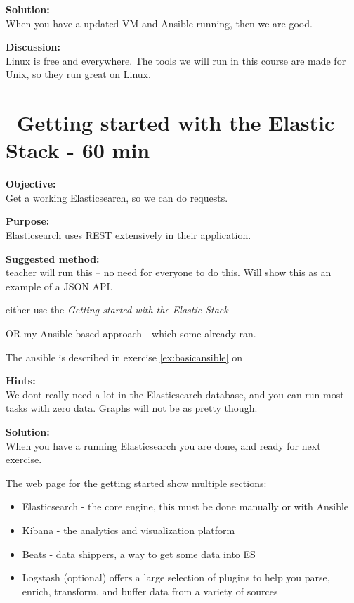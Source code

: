 \documentclass[a4paper,11pt,notitlepage]{report}
\begin{document}
{\bf Solution:}\\
When you have a updated VM and Ansible running, then we are good.

{\bf Discussion:}\\
Linux is free and everywhere. The tools we will run in this course are made for Unix, so they run great on Linux.



\chapter{\faInfoCircle\ Getting started with the Elastic Stack - 60 min}
\label{ex:dateformats}


{\bf Objective:}\\
Get a working Elasticsearch, so we can do requests.

{\bf Purpose:}\\
Elasticsearch uses REST extensively in their application.

{\bf Suggested method:}\\

{\large teacher will run this -- no need for everyone to do this. Will show this as an example of a JSON API.}


either use the
\emph{Getting started with the Elastic Stack}

OR my Ansible based approach - which some already ran.

The ansible is described in exercise \ref{ex:basicansible} on \pageref{ex:basicansible}

{\bf Hints:}\\
We dont really need a lot in the Elasticsearch database, and you can run most tasks with zero data. Graphs will not be as pretty though.

{\bf Solution:}\\
When you have a running Elasticsearch you are done, and ready for next exercise.

The web page for the getting started show multiple sections:
\begin{itemize}
\item Elasticsearch - the core engine, this must be done manually or with Ansible
\item Kibana - the analytics and visualization platform
\item Beats - data shippers, a way to get some data into ES
\item Logstash (optional) offers a large selection of plugins to help you parse, enrich, transform, and buffer data from a variety of sources
\end{itemize}
\end{document}
